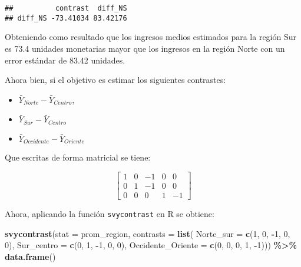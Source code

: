 \documentclass[
  12pt,
]{book}
\newenvironment{Shaded}{\begin{snugshade}}{\end{snugshade}}
\newcommand{\AttributeTok}[1]{\textcolor[rgb]{0.13,0.29,0.53}{#1}}
\newcommand{\DecValTok}[1]{\textcolor[rgb]{0.00,0.00,0.81}{#1}}
\newcommand{\FunctionTok}[1]{\textcolor[rgb]{0.13,0.29,0.53}{\textbf{#1}}}
\newcommand{\NormalTok}[1]{#1}
\newcommand{\SpecialCharTok}[1]{\textcolor[rgb]{0.81,0.36,0.00}{\textbf{#1}}}
\providecommand{\tightlist}{%
  \setlength{\itemsep}{0pt}\setlength{\parskip}{0pt}}
\begin{document}
\begin{verbatim}
##          contrast  diff_NS
## diff_NS -73.41034 83.42176
\end{verbatim}

Obteniendo como resultado que los ingresos medios estimados para la región Sur es 73.4 unidades monetarias mayor que los ingresos en la región Norte con un error estándar de 83.42 unidades.

Ahora bien, si el objetivo es estimar los siguientes contrastes:

\begin{itemize}
\tightlist
\item
  \(\bar{Y}_{Norte} - \bar{Y}_{Centro}\),
\item
  \(\bar{Y}_{Sur}-\bar{Y}_{Centro}\)
\item
  \(\bar{Y}_{Occidente}-\bar{Y}_{Oriente}\)
\end{itemize}

Que escritas de forma matricial se tiene:

\[
\left[\begin{array}{ccccc}
1 & 0 & -1 & 0 & 0\\
0 & 1 & -1 & 0 & 0\\
0 & 0 & 0 & 1 & -1
\end{array}\right]
\]

Ahora, aplicando la función \texttt{svycontrast} en R se obtiene:

\begin{Shaded}
\begin{Highlighting}[]
\FunctionTok{svycontrast}\NormalTok{(}\AttributeTok{stat =}\NormalTok{ prom\_region,}
            \AttributeTok{contrasts =} \FunctionTok{list}\NormalTok{(}
                             \AttributeTok{Norte\_sur =} \FunctionTok{c}\NormalTok{(}\DecValTok{1}\NormalTok{, }\DecValTok{0}\NormalTok{, }\SpecialCharTok{{-}}\DecValTok{1}\NormalTok{, }\DecValTok{0}\NormalTok{, }\DecValTok{0}\NormalTok{),}
                             \AttributeTok{Sur\_centro =} \FunctionTok{c}\NormalTok{(}\DecValTok{0}\NormalTok{, }\DecValTok{1}\NormalTok{, }\SpecialCharTok{{-}}\DecValTok{1}\NormalTok{, }\DecValTok{0}\NormalTok{, }\DecValTok{0}\NormalTok{),}
                             \AttributeTok{Occidente\_Oriente =} \FunctionTok{c}\NormalTok{(}\DecValTok{0}\NormalTok{, }\DecValTok{0}\NormalTok{, }\DecValTok{0}\NormalTok{, }\DecValTok{1}\NormalTok{, }\SpecialCharTok{{-}}\DecValTok{1}\NormalTok{))) }\SpecialCharTok{\%\textgreater{}\%}                               \FunctionTok{data.frame}\NormalTok{()}
\end{Highlighting}
\end{Shaded}
\end{document}
